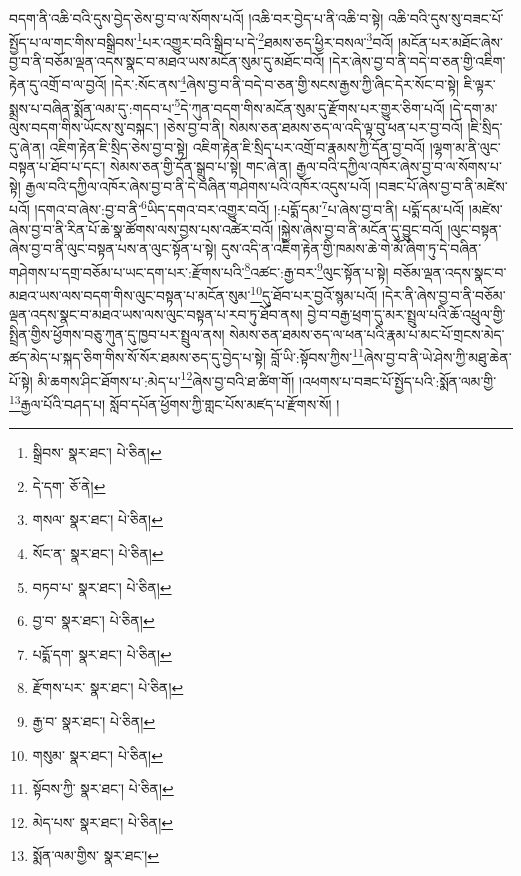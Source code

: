 བདག་ནི་འཆི་བའི་དུས་བྱེད་ཅེས་བྱ་བ་ལ་སོགས་པའོ། །འཆི་བར་བྱེད་པ་ནི་འཆི་བ་སྟེ། འཆི་བའི་དུས་སུ་བཟང་པོ་སྤྱོད་པ་ལ་གང་གིས་བསྒྲིབས་\footnote{སྒྲིབས་  སྣར་ཐང་།  པེ་ཅིན། }པར་འགྱུར་བའི་སྒྲིབ་པ་དེ་\footnote{དེ་དག་  ཅོ་ནེ། }ཐམས་ཅད་ཕྱིར་བསལ་\footnote{གསལ་  སྣར་ཐང་།  པེ་ཅིན། }བའོ། །མངོན་པར་མཐོང་ཞེས་བྱ་བ་ནི་བཅོམ་ལྡན་འདས་སྣང་བ་མཐའ་ཡས་མངོན་སུམ་དུ་མཐོང་བའོ། །དེར་ཞེས་བྱ་བ་ནི་བདེ་བ་ཅན་གྱི་འཇིག་རྟེན་དུ་འགྲོ་བ་ལ་བྱའོ། །དེར་:སོང་ནས་\footnote{སོང་ན་  སྣར་ཐང་།  པེ་ཅིན། }ཞེས་བྱ་བ་ནི་བདེ་བ་ཅན་གྱི་སངས་རྒྱས་ཀྱི་ཞིང་དེར་སོང་བ་སྟེ། ཇི་ལྟར་སྨྲས་པ་བཞིན་སྨོན་ལམ་དུ་:གདབ་པ་\footnote{བཏབ་པ་  སྣར་ཐང་།  པེ་ཅིན། }དེ་ཀུན་བདག་གིས་མངོན་སུམ་དུ་རྫོགས་པར་གྱུར་ཅིག་པའོ། །དེ་དག་མ་ལུས་བདག་གིས་ཡོངས་སུ་བསྐང་། །ཅེས་བྱ་བ་ནི། སེམས་ཅན་ཐམས་ཅད་ལ་འདི་ལྟ་བུ་ཕན་པར་བྱ་བའོ། །ཇི་སྲིད་དུ་ཞེ་ན། འཇིག་རྟེན་ཇི་སྲིད་ཅེས་བྱ་བ་སྟེ། འཇིག་རྟེན་ཇི་སྲིད་པར་འགྲོ་བ་རྣམས་ཀྱི་དོན་བྱ་བའོ། །ལྷག་མ་ནི་ལུང་བསྟན་པ་ཐོབ་པ་དང་། སེམས་ཅན་གྱི་དོན་སྒྲུབ་པ་སྟེ། གང་ཞེ་ན། རྒྱལ་བའི་དཀྱིལ་འཁོར་ཞེས་བྱ་བ་ལ་སོགས་པ་སྟེ། རྒྱལ་བའི་དཀྱིལ་འཁོར་ཞེས་བྱ་བ་ནི་དེ་བཞིན་གཤེགས་པའི་འཁོར་འདུས་པའོ། །བཟང་པོ་ཞེས་བྱ་བ་ནི་མཛེས་པའོ། །དགའ་བ་ཞེས་:བྱ་བ་ནི་\footnote{བྱ་བ་  སྣར་ཐང་།  པེ་ཅིན། }ཡིད་དགའ་བར་འགྱུར་བའོ། །:པདྨོ་དམ་\footnote{པདྨོ་དག་  སྣར་ཐང་།  པེ་ཅིན། }པ་ཞེས་བྱ་བ་ནི། པདྨོ་དམ་པའོ། །མཛེས་ཞེས་བྱ་བ་ནི་རིན་པོ་ཆེ་སྣ་ཚོགས་ལས་བྱས་པས་འཚེར་བའོ། །སྐྱེས་ཞེས་བྱ་བ་ནི་མངོན་དུ་བྱུང་བའོ། །ལུང་བསྟན་ཞེས་བྱ་བ་ནི་ལུང་བསྟན་པས་ན་ལུང་སྟོན་པ་སྟེ། དུས་འདི་ན་འཇིག་རྟེན་གྱི་ཁམས་ཆེ་གེ་མོ་ཞིག་ཏུ་དེ་བཞིན་གཤེགས་པ་དགྲ་བཅོམ་པ་ཡང་དག་པར་:རྫོགས་པའི་\footnote{རྫོགས་པར་  སྣར་ཐང་།  པེ་ཅིན། }འཚང་:རྒྱ་བར་\footnote{རྒྱ་བ་  སྣར་ཐང་།  པེ་ཅིན། }ལུང་སྟོན་པ་སྟེ། བཅོམ་ལྡན་འདས་སྣང་བ་མཐའ་ཡས་ལས་བདག་གིས་ལུང་བསྟན་པ་མངོན་སུམ་\footnote{གསུམ་  སྣར་ཐང་།  པེ་ཅིན། }དུ་ཐོབ་པར་བྱའོ་སྙམ་པའོ། །དེར་ནི་ཞེས་བྱ་བ་ནི་བཅོམ་ལྡན་འདས་སྣང་བ་མཐའ་ཡས་ལས་ལུང་བསྟན་པ་རབ་ཏུ་ཐོབ་ནས། བྱེ་བ་བརྒྱ་ཕྲག་དུ་མར་སྤྲུལ་པའི་ཆོ་འཕྲུལ་གྱི་སྤྲིན་གྱིས་ཕྱོགས་བཅུ་ཀུན་དུ་ཁྱབ་པར་སྤྲུལ་ནས། སེམས་ཅན་ཐམས་ཅད་ལ་ཕན་པའི་རྣམ་པ་མང་པོ་གྲངས་མེད་ཚད་མེད་པ་སྐད་ཅིག་གིས་སོ་སོར་ཐམས་ཅད་དུ་བྱེད་པ་སྟེ། བློ་ཡི་:སྟོབས་ཀྱིས་\footnote{སྟོབས་ཀྱི་  སྣར་ཐང་།  པེ་ཅིན། }ཞེས་བྱ་བ་ནི་ཡེ་ཤེས་ཀྱི་མཐུ་ཆེན་པོ་སྟེ། མི་ཆགས་ཤིང་ཐོགས་པ་:མེད་པ་\footnote{མེད་པས་  སྣར་ཐང་།  པེ་ཅིན། }ཞེས་བྱ་བའི་ཐ་ཚིག་གོ། །འཕགས་པ་བཟང་པོ་སྤྱོད་པའི་:སྨོན་ལམ་གྱི་\footnote{སྨོན་ལམ་གྱིས་  སྣར་ཐང་། }རྒྱལ་པོའི་བཤད་པ། སློབ་དཔོན་ཕྱོགས་ཀྱི་གླང་པོས་མཛད་པ་རྫོགས་སོ། ། 
